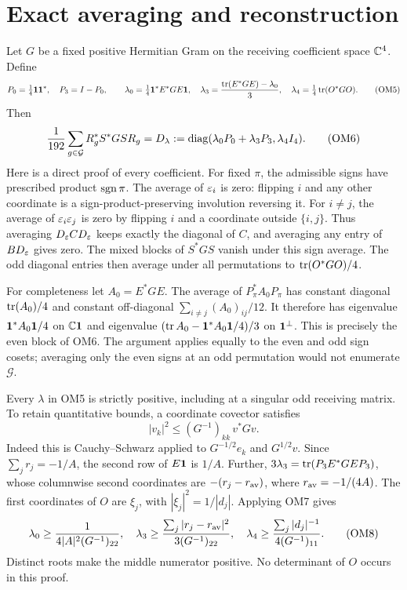 \documentclass[11pt]{article}
\begin{document}
\section{Exact averaging and reconstruction}
Let $G$ be a fixed positive Hermitian Gram on the receiving coefficient
space $\mathbb C^4$.  Define
\[
P_0=\tfrac14\mathbf 1\mathbf 1^*,\quad P_3=I-P_0,\qquad
\lambda_0=\tfrac14\mathbf 1^*E^*GE\mathbf 1,\quad
\lambda_3=\frac{\operatorname{tr}(E^*GE)-\lambda_0}{3},\quad
\lambda_4=\tfrac14\operatorname{tr}(O^*GO).
\tag{OM5}
\]
Then
\[
\frac1{192}\sum_{g\in\mathcal G}R_g^*S^*GS R_g
=D_\lambda:=
\operatorname{diag}(\lambda_0P_0+\lambda_3P_3,\lambda_4I_4).
\tag{OM6}
\]
Here is a direct proof of every coefficient.  For fixed $\pi$, the
admissible signs have prescribed product $\operatorname{sgn}\pi$.  The average of
$\varepsilon_i$ is zero: flipping $i$ and any other coordinate is a
sign-product-preserving involution reversing it.  For $i\ne j$,
the average of $\varepsilon_i\varepsilon_j$ is zero by flipping $i$ and a coordinate
outside $\{i,j\}$.  Thus averaging $D_\varepsilon C D_\varepsilon$ keeps exactly
the diagonal of $C$, and averaging any entry of $B D_\varepsilon$ gives
zero.  The mixed blocks of $S^*GS$ vanish under this sign average.
The odd diagonal entries then average under all permutations to
$\operatorname{tr}(O^*GO)/4$.

For completeness let $A_0=E^*GE$.  The average of $P_\pi^*A_0P_\pi$
has constant diagonal $\operatorname{tr}(A_0)/4$ and constant off-diagonal
$\sum_{i\ne j}(A_0)_{ij}/12$.  It therefore has eigenvalue
$\mathbf 1^*A_0\mathbf 1/4$ on $\mathbb C\mathbf 1$ and eigenvalue
$(\operatorname{tr} A_0-\mathbf 1^*A_0\mathbf 1/4)/3$ on $\mathbf 1^\perp$.
This is precisely the even block of OM6.  The argument applies
equally to the even and odd sign cosets; averaging only the
even signs at an odd permutation would not enumerate $\mathcal G$.

Every $\lambda$ in OM5 is strictly positive, including at a singular
odd receiving matrix.  To retain quantitative bounds, a coordinate
covector satisfies
\[
|v_k|^2\le (G^{-1})_{kk}\,v^*Gv.
\tag{OM7}
\]
Indeed this is Cauchy--Schwarz applied to $G^{-1/2}e_k$ and
$G^{1/2}v$.  Since $\sum_jr_j=-1/A$, the second row of $E\mathbf 1$
is $1/A$.  Further,
$3\lambda_3=\operatorname{tr}(P_3E^*GE P_3)$, whose columnwise second coordinates
are $-(r_j-r_{\rm av})$, where $r_{\rm av}=-1/(4A)$.
The first coordinates of $O$ are $\xi_j$, with
$|\xi_j|^2=1/|d_j|$.  Applying OM7 gives
\[
\lambda_0\ge\frac1{4|A|^2(G^{-1})_{22}},\quad
\lambda_3\ge
\frac{\sum_j|r_j-r_{\rm av}|^2}{3(G^{-1})_{22}},\quad
\lambda_4\ge\frac{\sum_j|d_j|^{-1}}{4(G^{-1})_{11}}.
\tag{OM8}
\]
Distinct roots make the middle numerator positive.  No determinant
of $O$ occurs in this proof.
\end{document}
